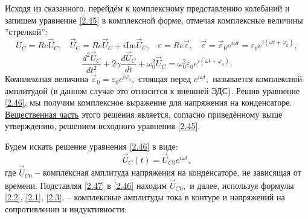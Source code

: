 Исходя из сказанного, перейдём к комплексному представлению колебаний и запишем урав\-нение \eqref{2.45} в комплексной форме, отмечая комплексные величины ''стрелкой'':
$$
U_C=Re\vec U_C,~~~~\vec U_C=Re\vec U_C+i\text{Im}\vec U_C,~~~~\varepsilon=Re\vec \varepsilon,~~~~\vec \varepsilon=\vec \varepsilon_0e^{i\omega t}=\varepsilon_0e^{i(\omega t+\varphi_0)},
$$
\begin{equation}\label{2.46}
\dfrac{d^2\vec U_C}{dt^2}+2\gamma\dfrac{d\vec U_C}{dt}+\omega_0^2\vec U_C=\omega_0^2\varepsilon_0e^{i(\omega t+\varphi_0)}.
\end{equation}
Комплексная величина $\vec \varepsilon_0=\varepsilon_0e^{i\varphi_0},$ стоящая перед $e^{i\omega t},$ называется \textsf{комплексной амплитудой} (в данном случае это относится к внешней ЭДС). Решив уравнение \eqref{2.46}, мы получим комплекс\-ное выражение для напряжения на конденсаторе. \underline{Вещественная часть} этого решения является, согласно приведённому выше утверждению, решением исходного уравнения \eqref{2.45}.

Будем искать решение уравнения \eqref{2.46} в виде:
\begin{equation}\label{2.47}
\vec U_C(t)=\vec U_{C0}e^{i\omega t},
\end{equation}
где $\vec U_{C0}$ \textbf{--} комплексная амплитуда напряжения на конденсаторе, не зависящая от времени. Подставляя \eqref{2.47} в \eqref{2.46} находим $\vec U_{C0},$ и далее, используя формулы \eqref{2.2}, \eqref{2.1}, \eqref{2.3}, \textsf{--} комплексные амплитуды тока в контуре и напряжений на сопротивлении и индуктивности:

